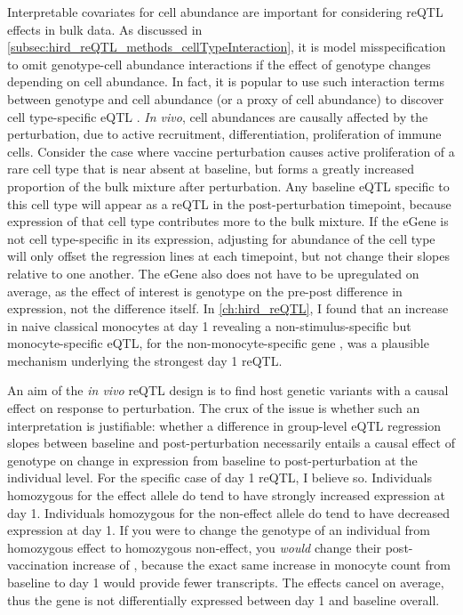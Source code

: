 Interpretable covariates for cell abundance are important for considering \gls{reQTL} effects in bulk data.
As discussed in \cref{subsec:hird_reQTL_methods_cellTypeInteraction}, 
it is model misspecification to omit genotype-cell abundance interactions if the effect of genotype changes depending on cell abundance.
In fact, it is popular to use such interaction terms between genotype and cell abundance (or a proxy of cell abundance) 
to discover cell type-specific \gls{eQTL} \autocite{westra2015CellSpecificEQTL,kim-hellmuth2020CellTypeSpecific}.
\textit{In vivo}, cell abundances are causally affected by the perturbation, due to active recruitment, differentiation, proliferation of immune cells.
Consider the case where vaccine perturbation causes active proliferation of a rare cell type that is near absent at baseline, 
but forms a greatly increased proportion of the bulk mixture after perturbation.
Any baseline \gls{eQTL} specific to this cell type will appear as a \gls{reQTL} in the post-perturbation timepoint, 
because expression of that cell type contributes more to the bulk mixture.
If the eGene is not cell type-specific in its expression, 
adjusting for abundance of the cell type will only offset the regression lines at each timepoint, but not change their slopes relative to one another.
The eGene also does not have to be upregulated on average, 
as the effect of interest is genotype on the pre-post difference in expression, not the difference itself.
In \cref{ch:hird_reQTL}, I found that an increase in naive classical monocytes at day 1 revealing a
non-stimulus-specific but monocyte-specific \gls{eQTL},
for the non-monocyte-specific gene ,
was a plausible mechanism underlying the strongest day 1 \gls{reQTL}.

An aim of the \textit{in vivo} \gls{reQTL} design is to find host genetic variants with a causal effect on response to perturbation.
The crux of the issue is whether such an interpretation is justifiable: whether a difference in group-level \gls{eQTL} regression slopes between baseline and post-perturbation
necessarily entails a causal effect of genotype on change in expression from baseline to post-perturbation at the individual level.
For the specific case of  day 1 \gls{reQTL}, I believe so.
Individuals homozygous for the effect allele do tend to have strongly increased expression at day 1.
Individuals homozygous for the non-effect allele do tend to have decreased expression at day 1.
If you were to change the genotype of an individual from homozygous effect to homozygous non-effect,
you \textit{would} change their post-vaccination increase of ,
because the exact same increase in monocyte count from baseline to day 1
would provide fewer  transcripts.
The effects cancel on average, thus the gene is not differentially expressed between day 1 and baseline overall.

